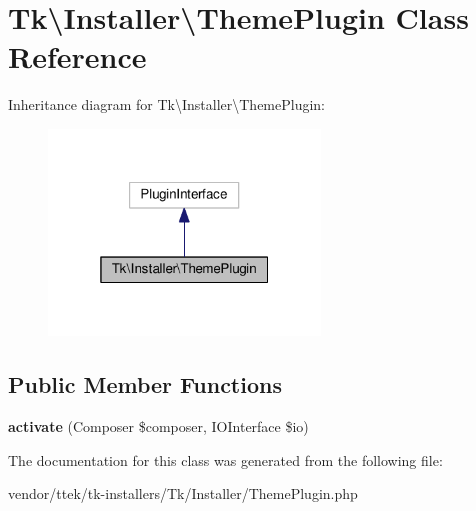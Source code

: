 \hypertarget{classTk_1_1Installer_1_1ThemePlugin}{\section{Tk\textbackslash{}Installer\textbackslash{}Theme\+Plugin Class Reference}
\label{classTk_1_1Installer_1_1ThemePlugin}
}


Inheritance diagram for Tk\textbackslash{}Installer\textbackslash{}Theme\+Plugin\+:\nopagebreak
\begin{figure}[H]
\begin{center}
\leavevmode
\includegraphics[width=205pt]{classTk_1_1Installer_1_1ThemePlugin__inherit__graph}
\end{center}
\end{figure}
\subsection*{Public Member Functions}
\begin{DoxyCompactItemize}
\item 
\hypertarget{classTk_1_1Installer_1_1ThemePlugin_a8c6bbdd1d2a4ca55763fbbce847cae44}{{\bfseries activate} (Composer \$composer, I\+O\+Interface \$io)}\label{classTk_1_1Installer_1_1ThemePlugin_a8c6bbdd1d2a4ca55763fbbce847cae44}

\end{DoxyCompactItemize}


The documentation for this class was generated from the following file\+:\begin{DoxyCompactItemize}
\item 
vendor/ttek/tk-\/installers/\+Tk/\+Installer/Theme\+Plugin.\+php\end{DoxyCompactItemize}

